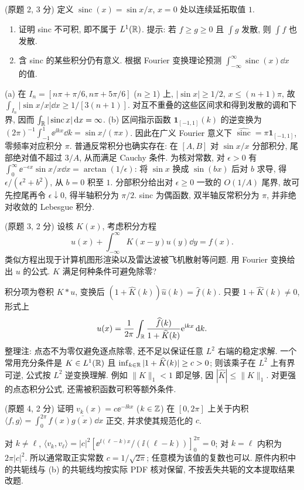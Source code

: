\begin{exercise}\label{ps7-q2}
(原题 2, 3 分) 定义 $\operatorname{sinc}(x)=\sin x/x$, $x=0$ 处以连续延拓取值 $1$.
\begin{enumerate}[label=(\alph*)]
\item 证明 sinc 不可积, 即不属于 $L^1(\mathbb R)$. 提示: 若 $f\ge g\ge0$ 且 $\int g$ 发散, 则 $\int f$ 也发散.
\item 含 sinc 的某些积分仍有意义. 根据 Fourier 变换理论预测 $\int_{-\infty}^{\infty}\operatorname{sinc}(x)\dd x$ 的值.
\end{enumerate}
\end{exercise}
\begin{solution}
(a) 在 $I_n=[n\pi+\pi/6,n\pi+5\pi/6]$ ($n\ge1$) 上,
$|\sin x|\ge1/2$, $x\le(n+1)\pi$, 故
$\int_{I_n}|\sin x/x|\dd x\ge1/[3(n+1)]$.
对互不重叠的这些区间求和得到发散的调和下界, 因而 $\int_\mathbb R|\operatorname{sinc}x|\,\mathrm d x=\infty$.
(b) 区间指示函数 $\mathbf1_{[-1,1]}(k)$ 的逆变换为
$(2\pi)^{-1}\int_{-1}^1\ee^{\ii kx}\dd k=\sin x/(\pi x)$.
因此在广义 Fourier 意义下 $\widehat{\operatorname{sinc}}=\pi\mathbf1_{[-1,1]}$, 零频率对应积分 $\pi$.
普通反常积分也确实存在: 在 $[A,B]$ 对 $\sin x/x$ 分部积分, 尾部绝对值不超过 $3/A$, 从而满足 Cauchy 条件.
为核对常数, 对 $\epsilon>0$ 有
$\int_0^\infty \ee^{-\epsilon x}\sin x/x\dd x=\arctan(1/\epsilon)$: 将 $\sin x$ 换成 $\sin(bx)$ 后对 $b$ 求导, 得 $\epsilon/(\epsilon^2+b^2)$, 从 $b=0$ 积至 $1$.
分部积分给出对 $\epsilon\ge0$ 一致的 $O(1/A)$ 尾界, 故可先控尾再令 $\epsilon\downarrow0$, 得半轴积分为 $\pi/2$. sinc 为偶函数, 双半轴反常积分为 $\pi$, 并非绝对收敛的 Lebesgue 积分.
\end{solution}

\begin{exercise}\label{ps7-q3}
(原题 3, 2 分) 设核 $K(x)$, 考虑积分方程
\[
u(x)+\int_{-\infty}^{\infty}K(x-y)u(y)\dd y=f(x).
\]
类似方程出现于计算机图形渲染以及雷达波被飞机散射等问题. 用 Fourier 变换给出 $u$ 的公式. $K$ 满足何种条件可避免除零?
\end{exercise}
\begin{solution}
积分项为卷积 $K*u$, 变换后
$(1+\widehat K(k))\widehat u(k)=\widehat f(k)$.
只要 $1+\widehat K(k)\ne0$, 形式上
\[
u(x)=\frac1{2\pi}\int_\mathbb R
\frac{\widehat f(k)}{1+\widehat K(k)}\mathrm e^{\mathrm i kx}\,\mathrm d k.
\]
整理注: 点态不为零仅避免逐点除零, 还不足以保证任意 $L^2$ 右端的稳定求解. 一个常用充分条件是 $K\in L^1(\mathbb R)$ 且
$\inf_{k\in\mathbb R}|1+\widehat K(k)|\ge c>0$; 则该乘子在 $L^2$ 上有界可逆, 公式按 $L^2$ 逆变换理解. 例如 $\|K\|_1<1$ 即足够, 因 $|\widehat K|\le\|K\|_1$. 对更强的点态积分公式, 还需被积函数可积等额外条件.
\end{solution}

\begin{exercise}\label{ps7-q4}
(原题 4, 2 分) 证明 $v_k(x)=c\ee^{-\ii kx}$ ($k\in\mathbb Z$) 在 $[0,2\pi]$ 上关于内积
$\langle f,g\rangle=\int_0^{2\pi}f(x)\overline{g(x)}\dd x$ 正交, 并求使其规范化的 $c$.
\end{exercise}
\begin{solution}
对 $k\ne\ell$,
$\langle v_k,v_\ell\rangle=|c|^2[\ee^{\ii(\ell-k)x}/(\ii(\ell-k))]_0^{2\pi}=0$;
对 $k=\ell$ 内积为 $2\pi|c|^2$. 所以通常取正实常数 $c=1/\sqrt{2\pi}$; 任意模为该值的复数也可以. 原件内积中的共轭线与 (b) 的共轭线均按实际 PDF 核对保留, 不按丢失共轭的文本提取结果改题.
\end{solution}
